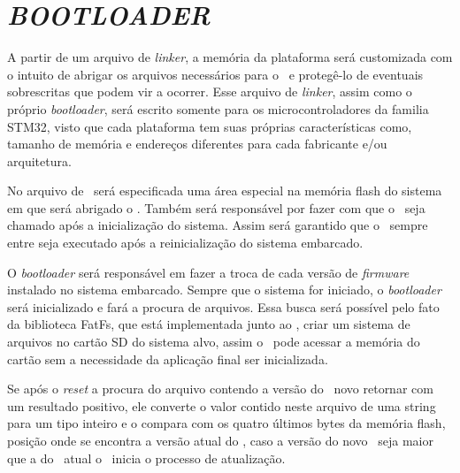 



\section{\textit{BOOTLOADER}}
\label{sec:Bootloader}

A partir de um arquivo de \textit{linker}, a memória da plataforma será customizada com o intuito de abrigar os arquivos necessários para o \bootloader\ e protegê-lo de eventuais sobrescritas que podem vir a ocorrer. Esse arquivo de \textit{linker}, assim como o próprio \textit{bootloader}, será escrito somente para os microcontroladores da familia STM32, visto que cada plataforma tem suas próprias características como, tamanho de memória e endereços diferentes para cada fabricante e/ou arquitetura.

No arquivo de \linker\ será especificada uma área especial na memória flash do sistema em que será abrigado o \bootloader. Também será responsável por fazer com que o \bootloader\ seja chamado após a inicialização do sistema. Assim será garantido que o \bootloader\ sempre entre seja executado após a reinicialização do sistema embarcado.


O \textit{bootloader} será responsável em fazer a troca de cada versão de \textit{firmware} instalado no sistema embarcado. Sempre que o sistema for iniciado, o \textit{bootloader} será inicializado e fará a procura de arquivos. Essa busca será possível pelo fato da biblioteca FatFs, que está implementada junto ao \bootloader, criar um sistema de arquivos no cartão SD do sistema alvo, assim o \bootloader\ pode acessar a memória do cartão sem a necessidade da aplicação final ser inicializada.

Se após o \textit{reset} a procura do arquivo contendo a versão do \firmware\ novo retornar com um resultado positivo, ele converte o valor contido neste arquivo de uma string para um tipo inteiro e o compara com os quatro últimos bytes da memória flash, posição onde se encontra a versão atual do \firmware , caso a versão do novo \firmware\ seja maior que a do \firmware\ atual o \bootloader\ inicia o processo de atualização.

